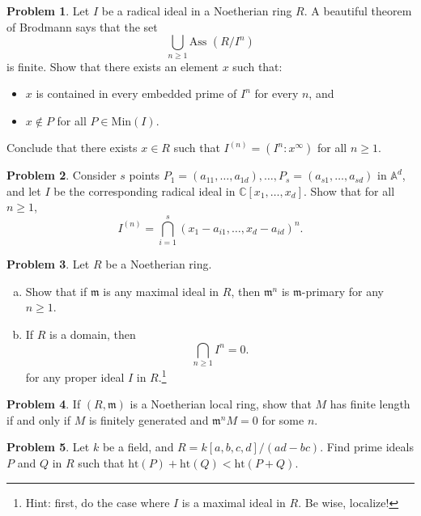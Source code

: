 \documentclass[11pt]{article}
\theoremstyle{definition}
\newtheorem{problem}{Problem}
\begin{document}
\begin{problem}
	Let $I$ be a radical ideal in a Noetherian ring $R$. A beautiful theorem of Brodmann says that the set
	$$\bigcup_{n \geqslant 1} \textrm{Ass } (R/I^n)$$
	is finite. Show that there exists an element $x$ such that:
	\begin{itemize}
		\item $x$ is contained in every embedded prime of $I^n$ for every $n$, and
		\item $x \notin P$ for all $P \in \textrm{Min}(I)$.
	\end{itemize}
	Conclude that there exists $x \in R$ such that $I^{(n)} = (I^n : x^\infty)$ for all $n \geqslant 1$.
\end{problem}



\begin{problem}
	Consider $s$ points $P_1 = (a_{11}, \ldots, a_{1d}), \ldots, P_s = (a_{s1}, \ldots, a_{sd})$ in $\mathbb{A}^d$, and let $I$ be the corresponding radical ideal in $\mathbb{C}[x_1, \ldots, x_d]$. Show that for all $n \geqslant 1$,
	$$I^{(n)} = \bigcap_{i=1}^s (x_1 - a_{i1}, \ldots, x_d - a_{id})^n.$$
\end{problem}

\begin{problem} 
Let $R$ be a Noetherian ring.
\begin{enumerate}[a)]
	\item Show that if $\mathfrak{m}$ is any maximal ideal in $R$, then $\mathfrak{m}^n$ is $\mathfrak{m}$-primary for any $n \geqslant 1$.
	\item If $R$ is a domain, then
	$$\bigcap_{n \geqslant 1} I^n = 0.$$
	for any proper ideal $I$ in $R$.\footnote{Hint: first, do the case where $I$ is a maximal ideal in $R$. Be wise, localize!}
\end{enumerate}
\end{problem}


\begin{problem}
If $(R, \mathfrak{m})$ is a Noetherian local ring, show that $M$ has finite length if and only if $M$ is finitely generated and $\mathfrak{m}^n M = 0$ for some $n$.
\end{problem}
	
	
\begin{problem}
	Let $k$ be a field, and $R = k[a,b,c,d]/(ad-bc)$. Find prime ideals $P$ and $Q$ in $R$ such that $\textrm{ht}(P) + \textrm{ht}(Q) < \textrm{ht}(P + Q)$.
\end{problem}
\end{document}
